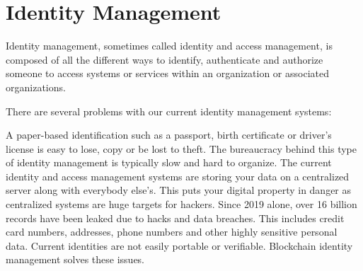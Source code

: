  
 
 
 
\section{Identity Management}
Identity management, sometimes called identity and access management, is composed of all the different ways to identify, authenticate and authorize someone to access systems or services within an organization or associated organizations. 

There are several problems with our current identity management systems:

A paper-based identification such as a passport, birth certificate or driver's license is easy to lose, copy or be lost to theft.
The bureaucracy behind this type of identity management is typically slow and hard to organize.
The current identity and access management systems are storing your data on a centralized server along with everybody else's. This puts your digital property in danger as centralized systems are huge targets for hackers.
Since 2019 alone, over 16 billion records have been leaked due to hacks and data breaches. This includes credit card numbers, addresses, phone numbers and other highly sensitive personal data.
Current identities are not easily portable or verifiable.
Blockchain identity management solves these issues. 


